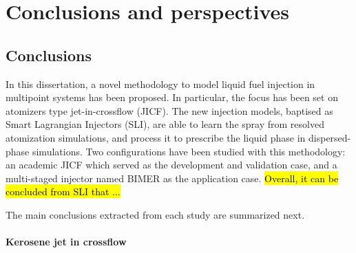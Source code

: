 \chapter{Conclusions and perspectives}

\section*{Conclusions}

In this dissertation, a novel methodology to model liquid fuel injection in multipoint systems has been proposed. In particular, the focus has been set on atomizers type jet-in-crossflow (JICF). The new injection models, baptised as Smart Lagrangian Injectors (SLI), are able to learn the spray from resolved atomization simulations, and process it to prescribe the liquid phase in dispersed-phase simulations. Two configurations have been studied with this methodology: an academic JICF which served as the development and validation case, and a multi-staged injector named BIMER as the application case. \hl{Overall, it can be concluded from SLI that ...}


The main conclusions extracted from each study are summarized next.


\subsubsection*{Kerosene jet in crossflow}

